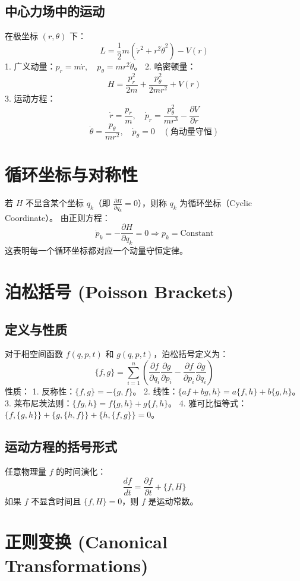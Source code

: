 \documentclass[11pt,a4paper]{article}
\begin{document}
\subsection{中心力场中的运动}
在极坐标 $(r, \theta)$ 下：
\[ L = \frac{1}{2}m(\dot{r}^2 + r^2\dot{\theta}^2) - V(r) \]
1. 广义动量：$p_r = m\dot{r}, \quad p_\theta = mr^2\dot{\theta}$。
2. 哈密顿量：
\[ H = \frac{p_r^2}{2m} + \frac{p_\theta^2}{2mr^2} + V(r) \]
3. 运动方程：
\[ \dot{r} = \frac{p_r}{m}, \quad \dot{p}_r = \frac{p_\theta^2}{mr^3} - \frac{\partial V}{\partial r} \]
\[ \dot{\theta} = \frac{p_\theta}{mr^2}, \quad \dot{p}_\theta = 0 \quad (\text{角动量守恒}) \]

\section{循环坐标与对称性}
若 $H$ 不显含某个坐标 $q_k$（即 $\frac{\partial H}{\partial q_k} = 0$），则称 $q_k$ 为循环坐标（Cyclic Coordinate）。
由正则方程：
\[ \dot{p}_k = -\frac{\partial H}{\partial q_k} = 0 \Rightarrow p_k = \text{Constant} \]
这表明每一个循环坐标都对应一个动量守恒定律。

\section{泊松括号 (Poisson Brackets)}

\subsection{定义与性质}
对于相空间函数 $f(q, p, t)$ 和 $g(q, p, t)$，泊松括号定义为：
\[ \{f, g\} = \sum_{i=1}^n \left( \frac{\partial f}{\partial q_i} \frac{\partial g}{\partial p_i} - \frac{\partial f}{\partial p_i} \frac{\partial g}{\partial q_i} \right) \]
性质：
1. 反称性：$\{f, g\} = -\{g, f\}$。
2. 线性：$\{af+bg, h\} = a\{f, h\} + b\{g, h\}$。
3. 莱布尼茨法则：$\{fg, h\} = f\{g, h\} + g\{f, h\}$。
4. 雅可比恒等式：$\{f, \{g, h\}\} + \{g, \{h, f\}\} + \{h, \{f, g\}\} = 0$。

\subsection{运动方程的括号形式}
任意物理量 $f$ 的时间演化：
\[ \frac{df}{dt} = \frac{\partial f}{\partial t} + \{f, H\} \]
如果 $f$ 不显含时间且 $\{f, H\} = 0$，则 $f$ 是运动常数。

\section{正则变换 (Canonical Transformations)}
\end{document}
